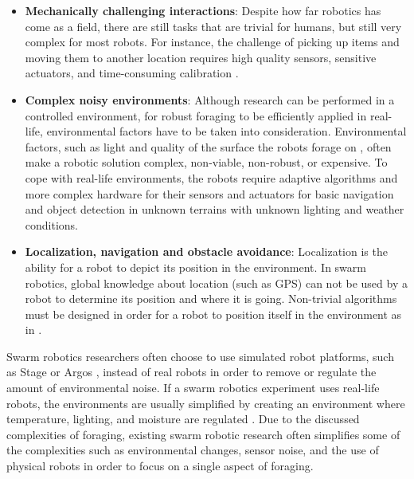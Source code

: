 \begin{itemize}
\item \textbf{Mechanically challenging interactions}: Despite how far robotics has come as a field, there are still tasks that are trivial for humans, but still very complex for most robots. For instance, the challenge of picking up items \cite{saxena2008robotic} and moving them to another location requires high quality sensors, sensitive actuators, and time-consuming calibration \cite{mondada2005cooperation}. 

\item \textbf{Complex noisy environments}: Although research can be performed in a controlled environment, for robust foraging to be efficiently applied in real-life, environmental factors have to be taken into consideration. Environmental factors, such as light \cite{browning2005real,jungel2003real} and quality of the surface the robots forage on \cite{trianni2006cooperative}, often make a robotic solution complex, non-viable, non-robust, or expensive. To cope with real-life environments, the robots require adaptive algorithms and more complex hardware for their sensors and actuators for basic navigation and object detection in unknown terrains with unknown lighting and weather conditions. 

\item \textbf{Localization, navigation and obstacle avoidance}: Localization is the ability for a robot to depict its position in the environment. In swarm robotics, global knowledge about location (such as GPS) can not be used by a robot to determine its position and where it is going. Non-trivial algorithms must be designed in order for a robot to position itself in the environment as in \cite{zhou2012motion,rothermich2004distributed,arkin1992cooperation}. 

\end{itemize}

Swarm robotics researchers often choose to use simulated robot platforms, such as Stage \cite{vaughan2008massively} or Argos \cite{pinciroli2011argos}, instead of real robots in order to remove or regulate the amount of environmental noise. If a swarm robotics experiment uses real-life robots, the environments are usually simplified by creating an environment where temperature, lighting, and moisture are regulated \cite{labella2006division,nouyan2006group}. Due to the discussed complexities of foraging, existing swarm robotic research often simplifies some of the complexities such as environmental changes, sensor noise, and the use of physical robots in order to focus on a single aspect of foraging. 


